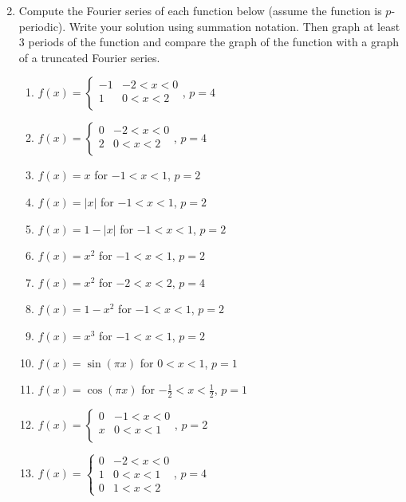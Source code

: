 \begin{enumerate}
\begin{multicols}{2}
\begin{enumerate}
	\end{enumerate}
	\end{multicols}
	
	\item Compute the Fourier series of each function below (assume the function is $p$-periodic). Write your solution using summation notation. Then graph at least 3 periods of the function and compare the graph of the function with a graph of a truncated Fourier series.
	\begin{multicols}{2}
\begin{enumerate}
	\item $f(x) = 
	\begin{cases}
	-1 & -2<x<0\\
	1 & 0<x<2\\
	\end{cases}$, $p=4$
	\item $f(x) = 
	\begin{cases}
	0 & -2<x<0\\
	2 & 0<x<2\\
	\end{cases}$, $p=4$
	\item $f(x) =x $ for $-1<x<1$, $p=2$
	\item $f(x) =|x| $ for $-1<x<1$, $p=2$
	\item $f(x) =1-|x| $ for $-1<x<1$, $p=2$
	\item $f(x) =x^2 $ for $-1<x<1$, $p=2$
	\item $f(x) =x^2 $ for $-2<x<2$, $p=4$
	\item $f(x) =1-x^2 $ for $-1<x<1$, $p=2$
	\item $f(x) =x^3 $ for $-1<x<1$, $p=2$
	\item $f(x) =\sin(\pi x) $ for $0<x<1$, $p=1$
	\item $f(x) =\cos(\pi x) $ for $-\frac12<x<\frac12$, $p=1$
	\item $f(x) = 
	\begin{cases}
	0 & -1<x<0\\
	x & 0<x<1\\
	\end{cases}$, $p=2$
	\item $f(x) = 
	\begin{cases}
	0 & -2<x<0\\
	1 & 0<x<1\\
	0 & 1<x<2
	\end{cases}$, $p=4$
\end{enumerate}
	\end{multicols}
	

\end{enumerate}
